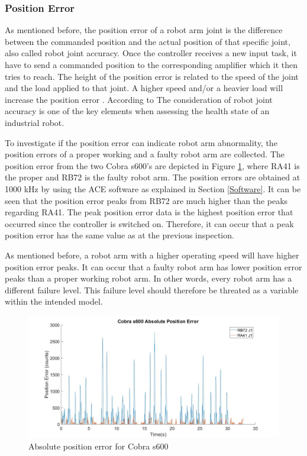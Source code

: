 \subsubsection{Position Error} \label{Position Error}
As mentioned before, the position error of a robot arm joint is the difference between the commanded position and the actual position of that specific joint, also called robot joint accuracy. Once the controller receives a new input task, it have to send a commanded position to the corresponding amplifier which it then tries to reach. The height of the position error is related to the speed of the joint and the load applied to that joint. A higher speed and/or a heavier load will increase the position error \parencite{Qian1996}. According to \citet{Qiao2017} The consideration of robot joint accuracy is one of the key elements when assessing the health state of an industrial robot.

To investigate if the position error can indicate robot arm abnormality, the position errors of a proper working and a faulty robot arm are collected. The position error from the two Cobra s600's are depicted in Figure \ref{fig:HighFreqPosError}, where RA41 is the proper and RB72 is the faulty robot arm. The position errors are obtained at 1000 kHz by using the ACE software as explained in Section \ref{Software}. It can be seen that the position error peaks from RB72 are much higher than the peaks regarding RA41. The peak position error data is the highest position error that occurred since the controller is switched on. Therefore, it can occur that a peak position error has the same value as at the previous inspection.

As mentioned before, a robot arm with a higher operating speed will have higher position error peaks. It can occur that a faulty robot arm has lower position error peaks than a proper working robot arm. In other words, every robot arm has a different failure level. This failure level should therefore be threated as a variable within the intended model.
\begin{figure}[ht]
\centering
\includegraphics[width=\textwidth]{Figures/HighFreqError20}
\caption[Absolute position error for Cobra s600]{Absolute position error for Cobra s600} \label{fig:HighFreqPosError}
\end{figure}


